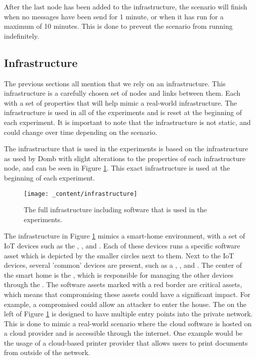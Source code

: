 After the last node has been added to the infrastructure, the scenario will finish when no messages have been send for 1 minute, or when it has run for a maximum of 10 minutes. This is done to prevent the scenario from running indefinitely.


\subsection{Infrastructure}
\label{ssec:infrastructure}
The previous sections all mention that we rely on an infrastructure. This infrastructure is a carefully chosen set of nodes and links between them. Each with a set of properties that will help mimic a real-world infrastructure. The infrastructure is used in all of the experiments and is reset at the beginning of each experiment. It is important to note that the infrastructure is not static, and could change over time depending on the scenario.

The infrastructure that is used in the experiments is based on the infrastructure as used by Domb \cite{domb2019smart} with slight alterations to the properties of each infrastructure node, and can be seen in Figure \ref{fig:infrastructure}. This exact infrastructure is used at the beginning of each experiment.

\begin{figure}[H]
    \centering
    \texttt{[image: \_content/infrastructure]}
    \caption{The full infrastructure including software that is used in the experiments.}
    \label{fig:infrastructure}
\end{figure}

The infrastructure in Figure \ref{fig:infrastructure} mimics a smart-home environment, with a set of IoT devices such as the , , and . Each of these devices runs a specific software asset which is depicted by the smaller circles next to them. Next to the IoT devices, several 'common' devices are present, such as a , , and . The center of the smart home is the , which is responsible for managing the other devices through the . The software assets marked with a red border are critical assets, which means that compromising these assets could have a significant impact. For example, a compromised  could allow an attacker to enter the house. The  on the left of Figure \ref{fig:infrastructure} is designed to have multiple entry points into the private network. This is done to mimic a real-world scenario where the cloud software is hosted on a cloud provider and is accessible through the internet. One example would be the usage of a cloud-based printer provider that allows users to print documents from outside of the network.


